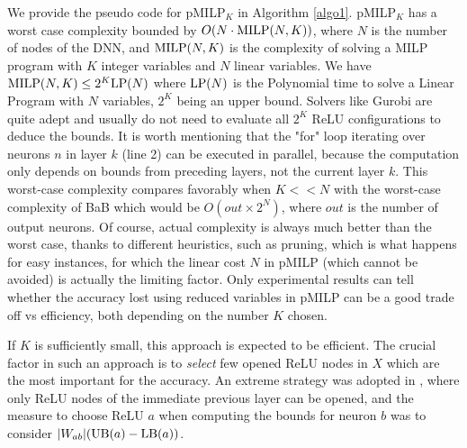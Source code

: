 We provide the pseudo code for pMILP$_K$ in Algorithm \ref{algo1}.
pMILP$_K$ has a worst case complexity bounded by $O(N \cdot {\textrm{MILP}}(N,K))$, 
where $N$ is the number of nodes of the DNN, and ${\textrm{MILP}}(N,K)$ is the complexity of solving a MILP program with $K$ integer variables and $N$ linear variables.
We have ${\textrm{MILP}}(N,K) \leq 2^K {\textrm{LP}}(N)$ where ${\textrm{LP}}(N)$ is the Polynomial time to solve a Linear Program with $N$ variables, $2^K$ being an upper bound. Solvers like Gurobi are quite adept and usually do not need to evaluate all $2^K$ ReLU configurations to deduce the bounds.
It is worth mentioning that the "for" loop iterating over neurons $n$ in layer $k$ (line 2) can be executed in parallel, because the computation only depends on bounds from preceding layers, not the current layer $k$. This worst-case complexity compares favorably when $K<<N$ with the worst-case complexity of BaB which would be $O(out \times 2^N)$, where $out$ is the number of output neurons. Of course, actual complexity is always much better than the worst case, thanks to different heuristics, such as pruning, which is what happens for easy instances, for which the linear cost $N$ in pMILP (which cannot be avoided) is actually the limiting factor. Only experimental results can tell whether the accuracy lost using reduced variables in pMILP can be a good trade off vs efficiency, both depending on the number $K$ chosen.


If $K$ is sufficiently small, 
this approach is expected to be efficient. 
The crucial factor in such an approach is to {\em select} few opened ReLU nodes in $X$ which are the most important for the accuracy. An extreme strategy was adopted in 
\cite{DivideAndSlide}, where only ReLU nodes of the immediate previous layer can be opened, and the measure to choose ReLU $a$ when computing the bounds for neuron $b$ was to consider $|W_{ab}| (\mathrm{UB}(a)-\mathrm{LB}(a))$. 
